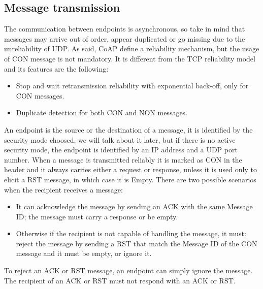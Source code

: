 	\subsection{Message transmission}
	The communication between endpoints is asynchronous, so take in mind that messages may arrive out of order, appear duplicated or go missing due to the unreliability of UDP.\newline
	As said, CoAP define a reliability mechanism, but the usage of CON message is not mandatory. It is different from the TCP reliability model and its features are the following:\newline
	\begin{itemize}
		\item Stop and wait retransmission reliability with exponential back-off, only for CON messages.
		\item Duplicate detection for both CON and NON messages.
	\end{itemize}

	An endpoint is the source or the destination of a message, it is identified by the security mode choosed, we will talk about it later, but if there is no active security mode, the endpoint is identified by an IP address and a UDP port number.\newline
	When a message is transmitted reliably it is marked as CON in the header and it always carries either a request or response, unless it is used only to elicit a RST message, in which case it is Empty.\newline
	There are two possible scenarios when the recipient receives a message:\newline
		\begin{itemize}
		\item It can acknowledge the message by sending an ACK with the same Message ID; the message must carry a response or be empty.
		\item Otherwise if the recipient is not capable of handling the message, it must: reject the message by sending a RST that match the Message ID of the CON message and it must be empty, or ignore it.
	\end{itemize}

	To reject an ACK or RST message, an endpoint can simply ignore the message.\newline
	The recipient of an ACK or RST must not respond with an ACK or RST.\newline
	
